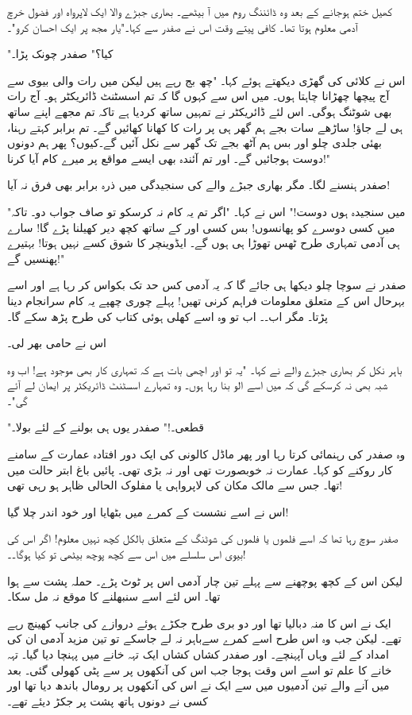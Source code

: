 کھیل ختم ہوجانے کے بعد وہ ڈائننگ روم میں آ بیٹھے۔ بھاری جبڑے والا ایک لاپرواہ اور فضول خرچ آدمی معلوم ہوتا تھا۔
کافی پیتے وقت اس نے صفدر سے کہا۔"یار مجھ پر ایک احسان کرو"۔

"کیا؟" صفدر چونک پڑا۔

اس نے کلائی کی گھڑی دیکھتے ہوئے کہا۔ "چھ بج رہے ہیں لیکن میں رات والی بیوی سے آج پیچھا چھڑانا چاہتا ہوں۔ میں اس سے کہوں گا کہ تم اسسٹنٹ ڈائریکٹر ہو۔ آج رات بھی شوٹنگ ہوگی۔ اس لئے ڈائریکٹر نے تمہیں ساتھ کردیا ہے تاکہ تم مجھے اپنے ساتھ ہی لے جاؤ! ساڑھے سات بجے ہم گھر ہی پر رات کا کھانا کھائیں گے۔ تم برابر کہتے رہنا، بھئی جلدی چلو اور بس ہم آٹھ بجے تک گھر سے نکل آئیں گے۔کیوں؟ پھر ہم دونوں دوست ہوجائیں گے۔ اور تم آئندہ بھی ایسے مواقع پر میرے کام آیا کرنا!"

صفدر ہنسنے لگا۔ مگر بھاری جبڑے والے کی سنجیدگی میں ذرہ برابر بھی فرق نہ آیا!

"میں سنجیدہ ہوں دوست!" اس نے کہا۔ "اگر تم یہ کام نہ کرسکو تو صاف جواب دو۔ تاکہ میں کسی دوسرے کو پھانسوں! بس کسی اور کے ساتھ کچھ دیر کھیلنا پڑے گا! سارے ہی آدمی تمہاری طرح ٹھس تھوڑا ہی ہوں گے۔ ایڈوینچر کا شوق کسے نہیں ہوتا! بہتیرے پھنسیں گے!"

صفدر نے سوچا چلو دیکھا ہی جائے گا کہ یہ آدمی کس حد تک بکواس کر رہا ہے اور اسے بہرحال اس کے متعلق معلومات فراہم کرنی تھیں! پہلے چوری چھپے یہ کام سرانجام دینا پڑتا۔ مگر اب۔۔ اب تو وہ اسے کھلی ہوئی کتاب کی طرح پڑھ سکے گا۔

اس نے حامی بھر لی۔

باہر نکل کر بھاری جبڑے والے نے کہا۔ "یہ تو اور اچھی بات ہے کہ تمہاری کار بھی موجود ہے! اب وہ شبہ بھی نہ کرسکے گی کہ میں اسے الو بنا رہا ہوں۔ وہ تمہارے اسسٹنٹ ڈائریکٹر پر ایمان لے آئے گی"۔

"قطعی۔!" صفدر یوں ہی بولنے کے لئے بولا۔

وہ صفدر کی رہنمائی کرتا رہا اور پھر ماڈل کالونی کی ایک دور افتادہ عمارت کے سامنے کار روکنے کو کہا۔ عمارت نہ خوبصورت تھی اور نہ بڑی تھی۔ پائیں باغ ابتر حالت میں تھا۔ جس سے مالک مکان کی لاپرواہی یا مفلوک الحالی ظاہر ہو رہی تھی!

اس نے اسے نشست کے کمرے میں بٹھایا اور خود اندر چلا گیا!

صفدر سوچ رہا تھا کہ اسے فلموں یا فلموں کی شوٹنگ کے متعلق بالکل کچھ نہیں معلوم! اگر اس کی بیوی اس سلسلے میں اس سے کچھ پوچھ بیٹھی تو کیا ہوگا۔۔!

لیکن اس کے کچھ پوچھنے سے پہلے تین چار آدمی اس پر ٹوٹ پڑے۔ حملہ پشت سے ہوا تھا۔ اس لئے اسے سنبھلنے کا موقع نہ مل سکا۔

ایک نے اس کا منہ دبالیا تھا اور دو بری طرح جکڑے ہوئے دروازے کی جانب کھینچ رہے تھے۔ لیکن جب وہ اس طرح اسے کمرے سےباہر نہ لے جاسکے تو تین مزید آدمی ان کی امداد کے لئے وہاں آپہنچے۔ اور صفدر کشاں کشاں ایک تہہ خانے میں پہنچا دیا گیا۔ تہہ خانے کا علم تو اسے اس وقت ہوجا جب اس کی آنکھوں پر سے پٹی کھولی گئی۔ بعد میں آنے والے تین آدمیوں میں سے ایک نے اس کی آنکھوں پر رومال باندھ دیا تھا اور کسی نے دونوں ہاتھ پشت پر جکڑ دیئے تھے۔


